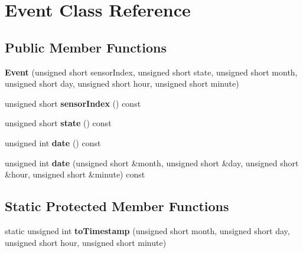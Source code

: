 \hypertarget{class_event}{}\section{Event Class Reference}
\label{class_event}
\subsection*{Public Member Functions}
\begin{DoxyCompactItemize}
\item 
\hypertarget{class_event_a90856e33d5a09f7e5c450fb8e57e99c0}{}{\bfseries Event} (unsigned short sensor\+Index, unsigned short state, unsigned short month, unsigned short day, unsigned short hour, unsigned short minute)\label{class_event_a90856e33d5a09f7e5c450fb8e57e99c0}

\item 
\hypertarget{class_event_a71211f207cb7b0eaf6b24fa01d2671d5}{}unsigned short {\bfseries sensor\+Index} () const \label{class_event_a71211f207cb7b0eaf6b24fa01d2671d5}

\item 
\hypertarget{class_event_ae8997b8a13e81d0d53405ef589726933}{}unsigned short {\bfseries state} () const \label{class_event_ae8997b8a13e81d0d53405ef589726933}

\item 
\hypertarget{class_event_a858e6e5e77422cd97d6ee5af7a913a29}{}unsigned int {\bfseries date} () const \label{class_event_a858e6e5e77422cd97d6ee5af7a913a29}

\item 
\hypertarget{class_event_a7c30686b65831e604a4c00fe0ab3970d}{}unsigned int {\bfseries date} (unsigned short \&month, unsigned short \&day, unsigned short \&hour, unsigned short \&minute) const \label{class_event_a7c30686b65831e604a4c00fe0ab3970d}

\end{DoxyCompactItemize}
\subsection*{Static Protected Member Functions}
\begin{DoxyCompactItemize}
\item 
\hypertarget{class_event_a3b27e449950a5322fc47cf82c2fa4583}{}static unsigned int {\bfseries to\+Timestamp} (unsigned short month, unsigned short day, unsigned short hour, unsigned short minute)\label{class_event_a3b27e449950a5322fc47cf82c2fa4583}

\end{DoxyCompactItemize}
